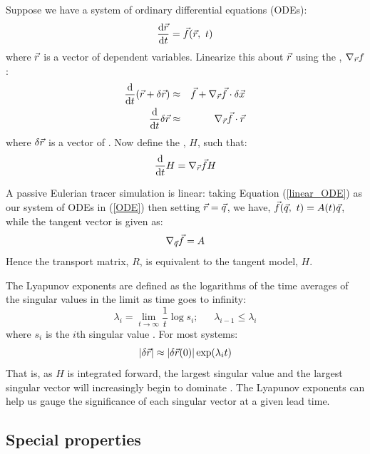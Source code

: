 Suppose we have a system of ordinary differential equations (ODEs):
\begin{equation}
	\frac{\mathrm d \vec r}{\mathrm d t} = \vec f(\vec r, ~ t)
	\label{ODE}
\end{equation}
where $\vec r$ is a vector of dependent variables.
Linearize this about $\vec r$ using the ,
$\nabla_{\vec r} f$:
\begin{eqnarray}
\frac{\mathrm d}{\mathrm d t} (\vec r + \delta \vec r) & \approx & \vec f + 
	\nabla_{\vec r} \vec f \cdot \delta \vec x \\
	\frac{\mathrm d}{\mathrm d t} \delta \vec r & \approx & \nabla_{\vec r} \vec f \cdot \vec r
\end{eqnarray}
where $\delta \vec r$ is a vector of .
Now define the , $H$, such that:
\begin{equation} 
	\frac{\mathrm d}{\mathrm d t} H = \nabla_{\vec r} \vec f H \\
\end{equation}

A passive Eulerian tracer simulation is linear:
taking Equation (\ref{linear_ODE}) as our system of ODEs in
(\ref{ODE}) then setting $\vec r=\vec q$, 
we have, $\vec f(\vec q, ~t)=A(t) \vec q$,
while the tangent vector is given as:
\begin{equation}
	\nabla_{\vec q} \vec f = A
\end{equation}
Hence the transport matrix, $R$, is equivalent to the tangent model, $H$.

The Lyapunov exponents are defined as the logarithms of the time averages
of the singular values in the limit as time goes to infinity:
\begin{equation}
\lambda_i = \lim_{t \rightarrow \infty} \frac{1}{t} \log s_i;
~~~~~~~\lambda_{i-1} \le \lambda_i
\end{equation}
where $s_i$ is the $i$th singular value \citep{Ott1993}.
For most systems:
\begin{equation}
|\delta \vec r| \approx |\delta \vec r(0) | \exp(\lambda_i t)
\label{lambda1}
\end{equation}
That is, as $H$ is integrated forward, the largest singular value and
the largest singular vector will increasingly begin to dominate
\citep{Ott1993}.
The Lyapunov exponents can help us gauge the significance of each
singular vector at a given lead time.

\subsection{Special properties}

